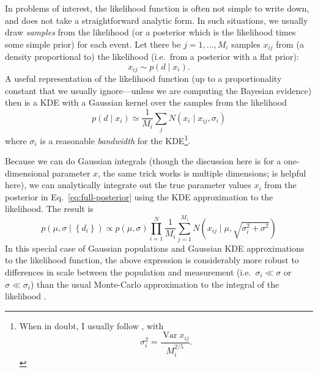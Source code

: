 \documentclass[modern]{aastex631}
\DeclareMathOperator{\var}{Var}
\begin{document}
In problems of interest, the likelihood function is often not simple to write
down, and does not take a straightforward analytic form.  In such situations, we
usually draw \emph{samples} from the likelihood (or a posterior which is the
likelihood times some simple prior) for each event.  Let there be $j = 1,
\ldots, M_i$ samples $x_{ij}$ from (a density proportional to) the likelihood
(i.e.\ from a posterior with a flat prior):
\begin{equation}
    x_{ij} \sim p\left( d \mid x_i \right).
\end{equation}
A useful representation of the likelihood function (up to a proportionality
constant that we usually ignore---unless we are computing the Bayesian evidence)
then is a \ac{KDE} with a Gaussian kernel over the samples from the likelihood
\begin{equation}
    p\left( d \mid x_i \right) \simeq \frac{1}{M_i} \sum_{j} N\left( x_i \mid x_{ij}, \sigma_i \right)
\end{equation}
where $\sigma_i$ is a reasonable \emph{bandwidth} for the \ac{KDE}\footnote{When
in doubt, I usually follow \citet{Scott1992}, with 
\begin{equation}
    \sigma_i^2 = \frac{\var x_{ij}}{M_i^{2/5}}.
\end{equation}
}.

Because we can do Gaussian integrals (though the discussion here is for a
one-dimensional parameter $x$, the same trick works is multiple dimensions;
\citet{Hogg2020} is helpful here), we can analytically integrate out the true
parameter values $x_i$ from the posterior in Eq.\ \eqref{eq:full-posterior}
using the \ac{KDE} approximation to the likelihood. The result is 
\begin{equation}
    p\left( \mu, \sigma \mid \left\{ d_i \right\} \right) \propto p\left( \mu, \sigma \right) \prod_{i=1}^N \frac{1}{M_i} \sum_{j=1}^{M_i} N\left( x_{ij} \mid \mu, \sqrt{\sigma_i^2 + \sigma^2} \right)
\end{equation}
In this special case of Gaussian populations and Gaussian \ac{KDE}
approximations to the likelihood function, the above expression is considerably
more robust to differences in scale between the population and measurement
(i.e.\ $\sigma_i \ll \sigma$ or $\sigma \ll \sigma_i$) than the usual
Monte-Carlo approximation to the integral of the likelihood
\citep[e.g.][]{Miller2020}.


\end{document}
